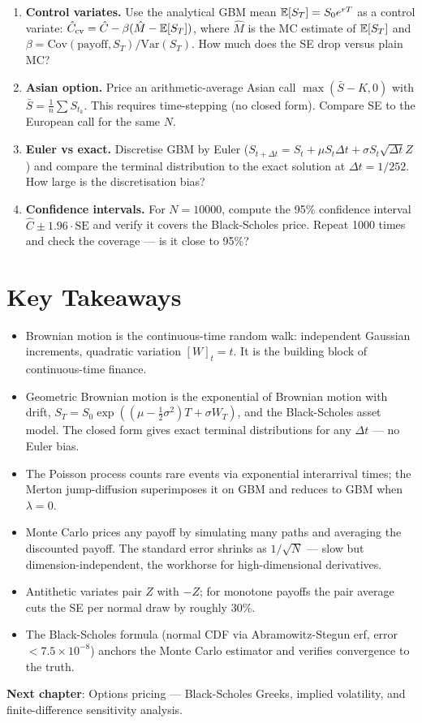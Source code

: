 \begin{enumerate}
    \item \textbf{Control variates.} Use the analytical GBM mean $\mathbb{E}[S_T] =
      S_0 e^{rT}$ as a control variate: $\hat{C}_{\text{cv}} = \hat{C} -
      \beta(\hat{M} - \mathbb{E}[S_T])$, where $\hat{M}$ is the MC estimate of
      $\mathbb{E}[S_T]$ and $\beta = \text{Cov}(\text{payoff}, S_T)/\text{Var}(S_T)$.
      How much does the SE drop versus plain MC?
    \item \textbf{Asian option.} Price an arithmetic-average Asian call
      $\max(\bar S - K, 0)$ with $\bar S = \frac{1}{n}\sum S_{t_k}$. This
      requires time-stepping (no closed form). Compare SE to the European
      call for the same $N$.
    \item \textbf{Euler vs exact.} Discretise GBM by Euler ($S_{t+\Delta t} =
      S_t + \mu S_t \Delta t + \sigma S_t \sqrt{\Delta t} Z$) and compare
      the terminal distribution to the exact solution at $\Delta t = 1/252$.
      How large is the discretisation bias?
    \item \textbf{Confidence intervals.} For $N = 10000$, compute the 95\%
      confidence interval $\hat{C} \pm 1.96 \cdot \text{SE}$ and verify it
      covers the Black-Scholes price. Repeat 1000 times and check the
      coverage --- is it close to 95\%?
\end{enumerate}

\section{Key Takeaways}

\begin{itemize}
    \item Brownian motion is the continuous-time random walk: independent
      Gaussian increments, quadratic variation $[W]_t = t$. It is the
      building block of continuous-time finance.
    \item Geometric Brownian motion is the exponential of Brownian motion
      with drift, $S_T = S_0 \exp((\mu - \tfrac{1}{2}\sigma^2)T + \sigma W_T)$,
      and the Black-Scholes asset model. The closed form gives exact terminal
      distributions for any $\Delta t$ --- no Euler bias.
    \item The Poisson process counts rare events via exponential interarrival
      times; the Merton jump-diffusion superimposes it on GBM and reduces to
      GBM when $\lambda = 0$.
    \item Monte Carlo prices any payoff by simulating many paths and averaging
      the discounted payoff. The standard error shrinks as $1/\sqrt{N}$ ---
      slow but dimension-independent, the workhorse for high-dimensional
      derivatives.
    \item Antithetic variates pair $Z$ with $-Z$; for monotone payoffs the
      pair average cuts the SE per normal draw by roughly 30\%.
    \item The Black-Scholes formula (normal CDF via Abramowitz-Stegun erf,
      error $< 7.5 \times 10^{-8}$) anchors the Monte Carlo estimator and
      verifies convergence to the truth.
\end{itemize}

\vspace{1em}
\noindent\textbf{Next chapter}: Options pricing --- Black-Scholes Greeks,
implied volatility, and finite-difference sensitivity analysis.